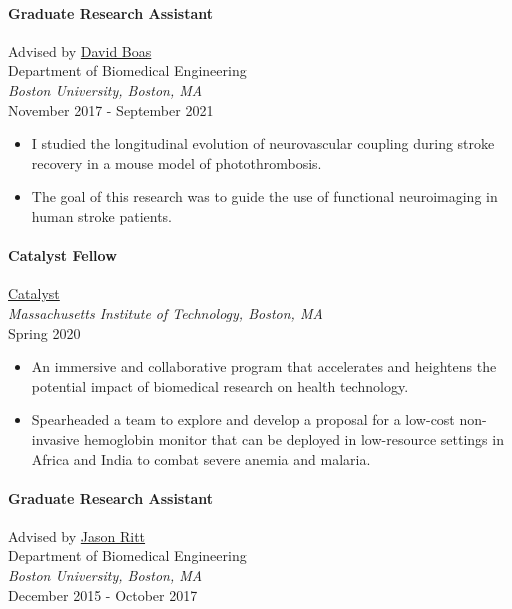 \documentclass[
  letterpaper,
  DIV=11,
  numbers=noendperiod]{scrartcl}
\let\oldparagraph\paragraph
\renewcommand{\paragraph}[1]{\oldparagraph{#1}\mbox{}}
\providecommand{\tightlist}{%
  \setlength{\itemsep}{0pt}\setlength{\parskip}{0pt}}\usepackage{longtable,booktabs,array}
\begin{document}
\hypertarget{graduate-research-assistant}{%
\paragraph{Graduate Research
Assistant}\label{graduate-research-assistant}}

Advised by \href{https://sites.bu.edu/boas/}{David Boas}\\
Department of Biomedical Engineering\\
\emph{Boston University, Boston, MA}\\
November 2017 - September 2021

\begin{itemize}
\tightlist
\item
  I studied the longitudinal evolution of neurovascular coupling during
  stroke recovery in a mouse model of photothrombosis.
\item
  The goal of this research was to guide the use of functional
  neuroimaging in human stroke patients.
\end{itemize}

\hypertarget{catalyst-fellow}{%
\paragraph{Catalyst Fellow}\label{catalyst-fellow}}

\href{https://catalyst.mit.edu/}{Catalyst}\\
\emph{Massachusetts Institute of Technology, Boston, MA}\\
Spring 2020

\begin{itemize}
\tightlist
\item
  An immersive and collaborative program that accelerates and heightens
  the potential impact of biomedical research on health technology.
\item
  Spearheaded a team to explore and develop a proposal for a low-cost
  non-invasive hemoglobin monitor that can be deployed in low-resource
  settings in Africa and India to combat severe anemia and malaria.
\end{itemize}

\hypertarget{graduate-research-assistant-1}{%
\paragraph{Graduate Research
Assistant}\label{graduate-research-assistant-1}}

Advised by \href{https://vivo.brown.edu/display/jritt}{Jason Ritt}\\
Department of Biomedical Engineering\\
\emph{Boston University, Boston, MA}\\
December 2015 - October 2017
\end{document}
